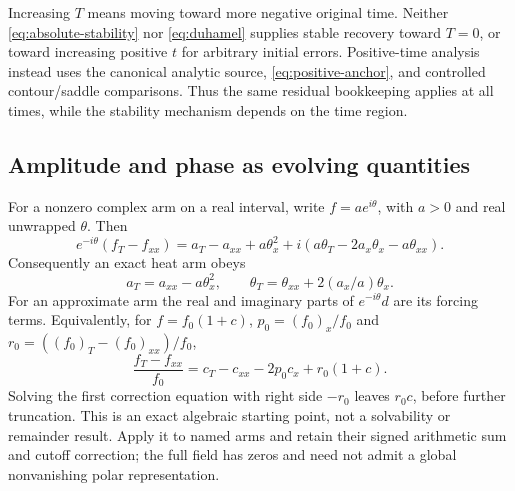 \documentclass[11pt]{article}
\numberwithin{equation}{section}
\begin{document}
Increasing \(T\) means moving toward more negative original time.
Neither \eqref{eq:absolute-stability} nor \eqref{eq:duhamel} supplies
stable recovery toward \(T=0\), or toward increasing positive \(t\)
for arbitrary initial errors. Positive-time analysis instead uses the
canonical analytic source, \eqref{eq:positive-anchor}, and controlled
contour/saddle comparisons. Thus the same residual bookkeeping applies
at all times, while the stability mechanism depends on the time region.

\subsection{Amplitude and phase as evolving quantities}
For a nonzero complex arm on a real interval, write
\(f=a e^{i\theta}\), with \(a>0\) and real unwrapped \(\theta\).
Then
\begin{equation}
 e^{-i\theta}(f_T-f_{xx})
 =a_T-a_{xx}+a\theta_x^2
  +i(a\theta_T-2a_x\theta_x-a\theta_{xx}).
 \label{eq:amplitude-phase-defect}
\end{equation}
Consequently an exact heat arm obeys
\begin{equation}
 a_T=a_{xx}-a\theta_x^2,\qquad
 \theta_T=\theta_{xx}+2(a_x/a)\theta_x.
 \label{eq:amplitude-phase-flow}
\end{equation}
For an approximate arm the real and imaginary parts of
\(e^{-i\theta}d\) are its forcing terms. Equivalently, for
\(f=f_0(1+c)\), \(p_0=(f_0)_x/f_0\) and
\(r_0=((f_0)_T-(f_0)_{xx})/f_0\),
\begin{equation}
 \frac{f_T-f_{xx}}{f_0}
 =c_T-c_{xx}-2p_0c_x+r_0(1+c).
 \label{eq:negative-correction-hierarchy}
\end{equation}
Solving the first correction equation with right side \(-r_0\)
leaves \(r_0c\), before further truncation. This is an exact algebraic
starting point, not a solvability or remainder result. Apply it to
named arms and retain their signed arithmetic sum and cutoff correction;
the full field has zeros and need not admit a global nonvanishing
polar representation.
\end{document}
